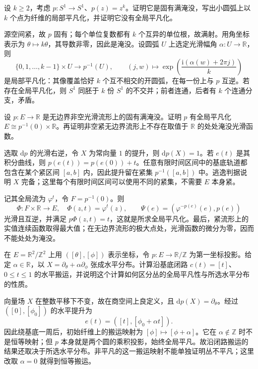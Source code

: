 \begin{exercise}\label{g2:ex:circle-proper-submersion}
	设 \(k\geq2\)，考虑 \(p:S^1\to S^1\)、\(p(z)=z^k\)。证明它是固有满淹没，写出小圆弧上以 \(k\) 个点为纤维的局部平凡化，并证明它没有全局平凡化。
\end{exercise}
\begin{solution}
	源空间紧，故 \(p\) 固有；每个单位复数都有 \(k\) 个互异的单位根，故满射。用角坐标表示为 \(\theta\mapsto k\theta\)，其导数非零，因此是淹没。设圆弧 \(U\) 上选定光滑幅角 \(\alpha:U\to\mathbb R\)，则
	\[
		\{0,1,\ldots,k-1\}\times U\longrightarrow p^{-1}(U),
		\qquad (j,w)\longmapsto\exp\!\left(\frac{\mathrm{i}(\alpha(w)+2\pi j)}{k}\right)
	\]
	是局部平凡化：其像覆盖恰好 \(k\) 个互不相交的开圆弧，在每一份上与 \(p\) 互逆。若存在全局平凡化，则 \(S^1\) 同胚于 \(k\) 份 \(S^1\) 的不交并；前者连通，后者有 \(k\) 个连通分支，矛盾。
\end{solution}

\begin{exercise}\label{g2:ex:proper-submersion-real-line}
	设 \(p:E\to\mathbb R\) 是无边界非空光滑流形上的固有满淹没。证明 \(p\) 有全局平凡化 \(E\cong p^{-1}(0)\times\mathbb R\)。再证明非空紧无边界流形上不存在取值于 \(\mathbb R\) 的处处淹没光滑函数。
\end{exercise}
\begin{solution}
	选取 \(\mathrm{d}p\) 的光滑右逆，令 \(X\) 为常向量 \(1\) 的提升，则 \(\mathrm{d}p(X)=1\)。若 \(e(t)\) 是其积分曲线，则 \(p(e(t))=p(e(0))+t\)。任意有限时间区间中的基底轨道都包含在某个紧区间 \([a,b]\) 内，因此提升留在紧集 \(p^{-1}([a,b])\) 中。逃逸判据说明 \(X\) 完备；这里每个有限时间区间可以使用不同的紧集，不需要 \(E\) 本身紧。

	记其全局流为 \(\varphi^t\)，令 \(F=p^{-1}(0)\)。则
	\[
		\Phi:F\times\mathbb R\longrightarrow E,\quad \Phi(z,t)=\varphi^t(z),
		\qquad \Psi(e)=(\varphi^{-p(e)}(e),p(e))
	\]
	光滑且互逆，并满足 \(p\Phi(z,t)=t\)，这就是所求全局平凡化。最后，紧流形上的实值连续函数取得最大值；在无边界流形的极大点处，光滑函数的微分为零，因而不能处处为淹没。
\end{solution}

\begin{exercise}\label{g2:ex:horizontal-holonomy-product}
	在 \(E=\mathbb R^2/\mathbb Z^2\) 上用 \(([\theta],[\phi])\) 表示坐标，令 \(p:E\to\mathbb R/\mathbb Z\) 为第一坐标投影。给定 \(\alpha\in\mathbb R\)，以 \(X=\partial_\theta+\alpha\partial_\phi\) 张成水平分布。计算沿基底闭路 \(c(t)=[t]\)、\(0\leq t\leq1\) 的水平搬运，并说明这个计算如何区分丛的全局平凡性与所选水平分布的性质。
\end{exercise}
\begin{solution}
	向量场 \(X\) 在整数平移下不变，故在商空间上良定义，且 \(\mathrm{d}p(X)=\partial_\theta\)。经过 \(([0],[\phi_0])\) 的水平提升为
	\[
		e(t)=([t],[\phi_0+\alpha t]).
	\]
	因此绕基底一周后，初始纤维上的搬运映射为 \([\phi]\mapsto[\phi+\alpha]\)。它在 \(\alpha\notin\mathbb Z\) 时不是恒等映射；但 \(p\) 本身就是两个圆的乘积投影，始终全局平凡。故沿闭路搬运的结果还取决于所选水平分布。非平凡的这一搬运映射不能单独证明丛不平凡；这里改取 \(\alpha=0\) 就得到恒等搬运。
\end{solution}
